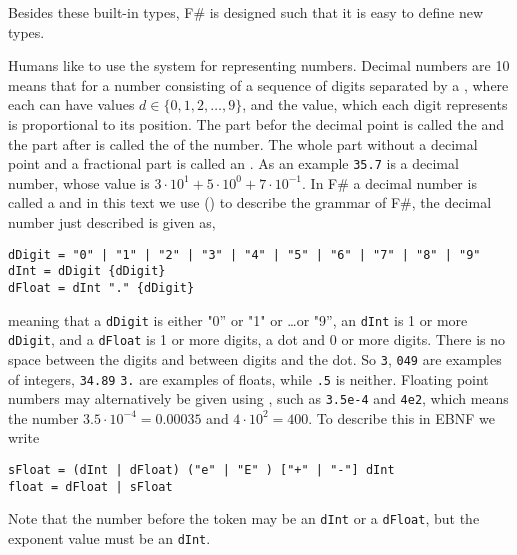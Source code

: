 Besides these built-in types, F\# is designed such that it is easy to define new types. 

Humans like to use the  system for representing numbers. Decimal numbers are  10 means that for a number consisting of a sequence of digits separated by a , where each  can have values $d \in \{0,1,2,\ldots,9\}$, and the value, which each digit represents is proportional to its position. The part befor the decimal point is called the  and the part after is called the  of the number. The whole part without a decimal point and a fractional part is called an . As an example \lstinline!35.7! is a decimal number, whose value is $3\cdot 10^1+5\cdot 10^0+7\cdot 10^{-1}$. In F\# a decimal number is called a  and in this text we use  () to describe the grammar of F\#, the decimal number just described is given as,
%
\begin{lstlisting}[language=EBNF]
dDigit = "0" | "1" | "2" | "3" | "4" | "5" | "6" | "7" | "8" | "9"
dInt = dDigit {dDigit}
dFloat = dInt "." {dDigit}
\end{lstlisting}
%
meaning that a \lstinline[language=ebnf]!dDigit! is either "0'' or "1" or \dots or "9'', an \lstinline[language=ebnf]!dInt! is 1 or more \lstinline[language=ebnf]!dDigit!, and a \lstinline[language=ebnf]!dFloat! is 1 or more digits, a dot and 0 or more digits. There is no space between the digits and between digits and the dot. So \lstinline!3!, \lstinline!049! are examples of integers, \lstinline!34.89! \lstinline!3.! are examples of floats, while \lstinline!.5! is neither.  Floating point numbers may alternatively be given using , such as \lstinline!3.5e-4! and \lstinline!4e2!, which means the number $3.5\cdot 10^{-4} = 0.00035$ and $4\cdot 10^2=400$. To describe this in EBNF we write
%
\begin{lstlisting}[language=EBNF]
sFloat = (dInt | dFloat) ("e" | "E" ) ["+" | "-"] dInt
float = dFloat | sFloat
\end{lstlisting}
%
Note that the number before the token  may be an \lstinline[language=ebnf]!dInt! or a \lstinline[language=ebnf]!dFloat!, but the exponent value must be an \lstinline[language=ebnf]!dInt!.

